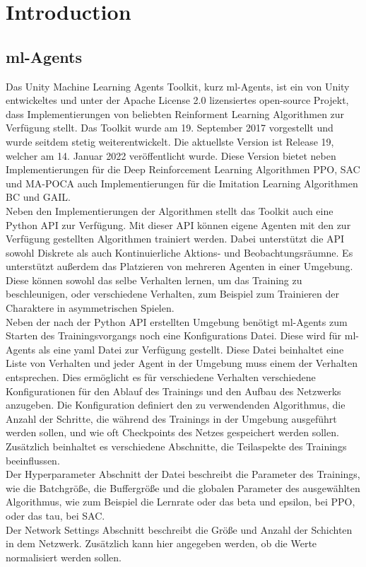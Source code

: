 \section{Introduction}
\subsection{ml-Agents}
Das Unity Machine Learning Agents Toolkit, kurz ml-Agents, ist ein von Unity entwickeltes und unter der Apache License 2.0 lizensiertes open-source Projekt, dass Implementierungen von beliebten Reinforment Learning Algorithmen zur Verfügung stellt.
Das Toolkit wurde am 19. September 2017 vorgestellt und wurde seitdem stetig weiterentwickelt. Die aktuellste Version ist Release 19, welcher am 14. Januar 2022 veröffentlicht wurde. Diese Version bietet neben Implementierungen für die Deep Reinforcement Learning Algorithmen PPO, SAC und MA-POCA auch Implementierungen für die Imitation Learning Algorithmen BC und GAIL.\\

\noindent Neben den Implementierungen der Algorithmen stellt das Toolkit auch eine Python API zur Verfügung. Mit dieser API können eigene Agenten mit den zur Verfügung gestellten Algorithmen trainiert werden. Dabei unterstützt die API sowohl Diskrete als auch Kontinuierliche Aktions- und Beobachtungsräumne. Es unterstützt außerdem das Platzieren von mehreren Agenten in einer Umgebung. Diese können sowohl das selbe Verhalten lernen, um das Training zu beschleunigen, oder verschiedene Verhalten, zum Beispiel zum Trainieren der Charaktere in asymmetrischen Spielen. \\

\noindent Neben der nach der Python API erstellten Umgebung benötigt ml-Agents zum Starten des Trainingsvorgangs noch eine Konfigurations Datei. Diese wird für ml-Agents als eine yaml Datei zur Verfügung gestellt. Diese Datei beinhaltet eine Liste von Verhalten und jeder Agent in der Umgebung muss einem der Verhalten entsprechen. Dies ermöglicht es für verschiedene Verhalten verschiedene Konfigurationen für den Ablauf des Trainings und den Aufbau des Netzwerks anzugeben. 
Die Konfiguration definiert den zu verwendenden Algorithmus, die Anzahl der Schritte, die während des Trainings in der Umgebung ausgeführt werden sollen, und wie oft Checkpoints des Netzes gespeichert werden sollen. Zusätzlich beinhaltet es verschiedene Abschnitte, die Teilaspekte des Trainings beeinflussen. \\
Der Hyperparameter Abschnitt der Datei beschreibt die Parameter des Trainings, wie die Batchgröße, die Buffergröße und die globalen Parameter des ausgewählten Algorithmus, wie zum Beispiel die Lernrate oder das beta und epsilon, bei PPO, oder das tau, bei SAC. \\
Der Network Settings Abschnitt beschreibt die Größe und Anzahl der Schichten in dem Netzwerk. Zusätzlich kann hier angegeben werden, ob die Werte normalisiert werden sollen.\\

